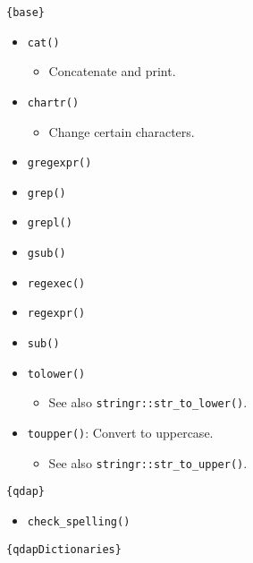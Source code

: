 \documentclass[
]{book}
\providecommand{\tightlist}{%
  \setlength{\itemsep}{0pt}\setlength{\parskip}{0pt}}
\begin{document}
\texttt{\{base\}}

\begin{itemize}
\tightlist
\item
  \texttt{cat()}

  \begin{itemize}
  \tightlist
  \item
    Concatenate and print.
  \end{itemize}
\item
  \texttt{chartr()}

  \begin{itemize}
  \tightlist
  \item
    Change certain characters.
  \end{itemize}
\item
  \texttt{gregexpr()}
\item
  \texttt{grep()}
\item
  \texttt{grepl()}
\item
  \texttt{gsub()}
\item
  \texttt{regexec()}
\item
  \texttt{regexpr()}
\item
  \texttt{sub()}
\item
  \texttt{tolower()}

  \begin{itemize}
  \tightlist
  \item
    See also \texttt{stringr::str\_to\_lower()}.
  \end{itemize}
\item
  \texttt{toupper()}: Convert to uppercase.

  \begin{itemize}
  \tightlist
  \item
    See also \texttt{stringr::str\_to\_upper()}.
  \end{itemize}
\end{itemize}

\texttt{\{qdap\}}

\begin{itemize}
\tightlist
\item
  \texttt{check\_spelling()}
\end{itemize}

\texttt{\{qdapDictionaries\}}
\end{document}

